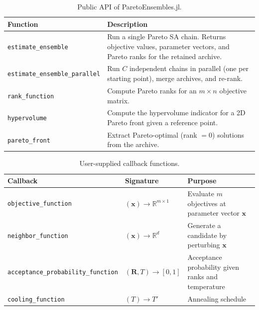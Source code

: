 \documentclass[preprint,review,12pt]{elsarticle}
\begin{document}
\begin{table}[ht]
\centering
\caption{Public API of ParetoEnsembles.jl.}\label{tab:api}
\begin{tabular}{@{}lp{7.5cm}@{}}
\toprule
\textbf{Function} & \textbf{Description} \\
\midrule
\texttt{estimate\_ensemble} & Run a single Pareto SA chain. Returns objective values, parameter vectors, and Pareto ranks for the retained archive. \\
\texttt{estimate\_ensemble\_parallel} & Run $C$ independent chains in parallel (one per starting point), merge archives, and re-rank. \\
\texttt{rank\_function} & Compute Pareto ranks for an $m \times n$ objective matrix. \\
\texttt{hypervolume} & Compute the hypervolume indicator for a 2D Pareto front given a reference point. \\
\texttt{pareto\_front} & Extract Pareto-optimal (rank $= 0$) solutions from the archive. \\
\bottomrule
\end{tabular}
\end{table}

\begin{table}[ht]
\centering
\caption{User-supplied callback functions.}\label{tab:callbacks}
\small
\begin{tabular}{@{}lp{2.8cm}p{4.5cm}@{}}
\toprule
\textbf{Callback} & \textbf{Signature} & \textbf{Purpose} \\
\midrule
\texttt{objective\_function} & $(\mathbf{x}) \to \mathbb{R}^{m \times 1}$ & Evaluate $m$ objectives at parameter vector $\mathbf{x}$ \\
\texttt{neighbor\_function} & $(\mathbf{x}) \to \mathbb{R}^{d}$ & Generate a candidate by perturbing $\mathbf{x}$ \\
\texttt{acceptance\_probability\_function} & $(\mathbf{R}, T) \to [0,1]$ & Acceptance probability given ranks and temperature \\
\texttt{cooling\_function} & $(T) \to T'$ & Annealing schedule \\
\bottomrule
\end{tabular}
\end{table}

\end{document}
